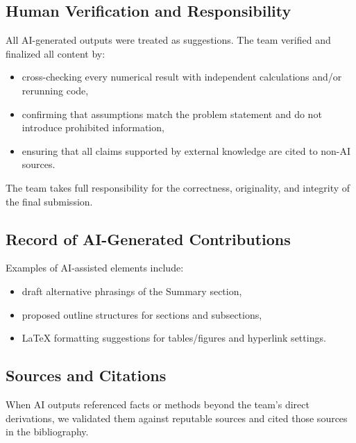 \documentclass[12pt]{article}
\begin{document}
\subsection*{Human Verification and Responsibility}
All AI-generated outputs were treated as suggestions. The team verified and finalized all content by:
\begin{itemize}
  \item cross-checking every numerical result with independent calculations and/or rerunning code,
  \item confirming that assumptions match the problem statement and do not introduce prohibited information,
  \item ensuring that all claims supported by external knowledge are cited to non-AI sources.
\end{itemize}
The team takes full responsibility for the correctness, originality, and integrity of the final submission.

\subsection*{Record of AI-Generated Contributions}
Examples of AI-assisted elements include:
\begin{itemize}
  \item draft alternative phrasings of the Summary section,
  \item proposed outline structures for sections and subsections,
  \item LaTeX formatting suggestions for tables/figures and hyperlink settings.
\end{itemize}

\subsection*{Sources and Citations}
When AI outputs referenced facts or methods beyond the team's direct derivations, we validated them against reputable sources and cited those sources in the bibliography.
\end{document}
